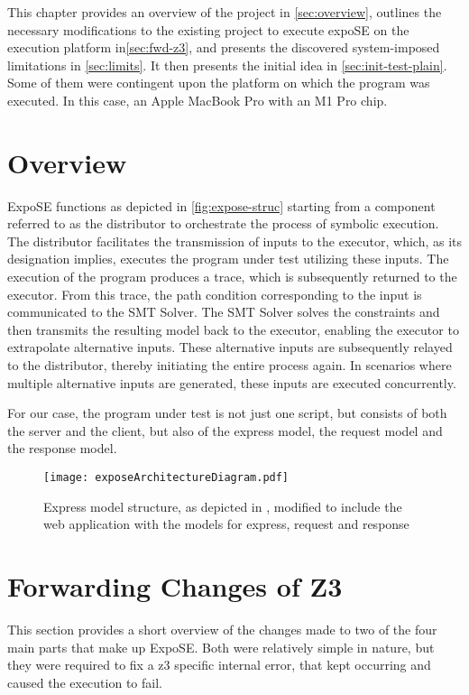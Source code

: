 
This chapter provides an overview of the project in \autoref{sec:overview}, outlines the necessary modifications to the existing project to execute expoSE on the execution platform in\autoref{sec:fwd-z3}, and presents the discovered system-imposed limitations in \autoref{sec:limits}. It then presents the initial idea in \autoref{sec:init-test-plain}. Some of them were contingent upon the platform on which the program was executed. In this case, an Apple MacBook Pro with an M1 Pro chip. 

\section{Overview}
\label{sec:overview}


ExpoSE functions as depicted in \autoref{fig:expose-struc} starting from a component referred to as the distributor to orchestrate the process of symbolic execution. The distributor facilitates the transmission of inputs to the executor, which, as its designation implies, executes the program under test utilizing these inputs. The execution of the program produces a trace, which is subsequently returned to the executor. From this trace, the path condition corresponding to the input is communicated to the SMT Solver. The SMT Solver solves the constraints and then transmits the resulting model back to the executor, enabling the executor to extrapolate alternative inputs. These alternative inputs are subsequently relayed to the distributor, thereby initiating the entire process again. In scenarios where multiple alternative inputs are generated, these inputs are executed concurrently.

For our case, the program under test is not just one script, but consists of both the server and the client, but also of the express model, the request model and the response model. 



\begin{figure}
  \centering
\texttt{[image: exposeArchitectureDiagram.pdf]}
 \caption{Express model structure, as depicted in \cite{loring_practical_2021}, modified to include the web application with the models for express, request and response}
     \label{fig:expose-struc}
\end{figure}


\FloatBarrier
\section{Forwarding Changes of Z3}
\label{sec:fwd-z3}
This section provides a short overview of the changes made to two of the four main parts that make up ExpoSE. Both were relatively simple in nature, but they were required to fix a z3 specific internal error, that kept occurring and caused the execution to fail.

